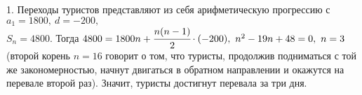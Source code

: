 1. Переходы туристов представляют из себя арифметическую прогрессию с $a_1=1800,\ d=-200,$\\$S_n=4800.$ Тогда $4800=1800n+\cfrac{n(n-1)}{2}\cdot(-200),\
n^2-19n+48=0,\ n=3$ (второй корень $n=16$ говорит о том, что туристы, продолжив подниматься с той же закономерностью, начнут двигаться в обратном направлении и окажутся на перевале второй раз). Значит, туристы достигнут перевала за три дня.\\
